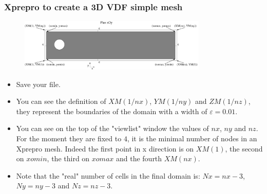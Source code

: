 \documentclass[10pt]{beamer}
\begin{document}
\begin{frame}
\frametitle{Xprepro to create a 3D VDF simple mesh}
\begin{block}{}

\begin{figure}
\includegraphics[width=0.8\textwidth]{PICTURES/xprepro1.pdf}
\end{figure}

\begin{itemize}
\item Save your file.
\item You can see the definition of $XM(1/nx)$, $YM(1/ny)$ and $ZM(1/nz)$, they represent the boundaries of the domain with a width of $\varepsilon=0.01$.
\item You can see on the top of the "viewlist" window the values of $nx$, $ny$ and $nz$. For the moment they are fixed to $4$, it is the minimal number of nodes in an Xprepro mesh. Indeed the first point in x direction is on $XM(1)$, the second on $xomin$, the third on $xomax$ and the fourth $XM(nx)$.
\item Note that the "real" number of cells in the final domain is: $Nx=nx-3$, $Ny=ny-3$ and $Nz=nz-3$.
\end{itemize}

\end{block}
\end{frame}
\end{document}
